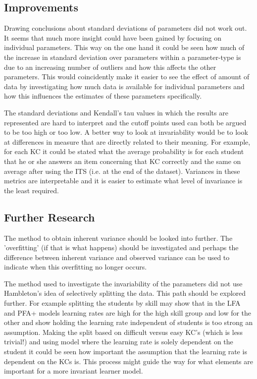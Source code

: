 \documentclass{scrartcl}
\begin{document}
\subsection{Improvements}
Drawing conclusions about standard deviations of parameters did not work out. It seems that much more insight could have been gained by focusing on individual parameters. This way on the one hand it could be seen how much of the increase in standard deviation over parameters within a parameter-type is due to an increasing number of outliers and how this affects the other parameters. This would coincidently make it easier to see the effect of amount of data by investigating how much data is available for individual parameters and how this influences the estimates of these parameters specifically.

The standard deviations and Kendall's tau values in which the results are represented are hard to interpret and the cutoff points used can both be argued to be too high or too low. A better way to look at invariability would be to look at differences in measure that are directly related to their meaning. For example, for each KC it could be stated what the average probability is for each student that he or she answers an item concerning that KC correctly and the same on average after using the ITS (i.e. at the end of the dataset). Variances in these metrics are interpretable and it is easier to estimate what level of invariance is the least required.

\subsection{Further Research}
The method to obtain inherent variance should be looked into further. The 'overfitting' (if that is what happens) should be investigated and perhaps the difference between inherent variance and observed variance can be used to indicate when this overfitting no longer occurs.

The method used to investigate the invariability of the parameters did not use Hambleton's idea of selectively splitting the data. This path should be explored further. For example splitting the students by skill may show that in the LFA and PFA+ models learning rates are high for the high skill group and low for the other and show holding the learning rate independent of students is too strong an assumption. Making the split based on difficult versus easy KC's (which is less trivial!) and using model where the learning rate is solely dependent on the student it could be seen how important the assumption that the learning rate is dependent on the KCs is. This process might guide the way for what elements are important for a more invariant learner model.
\end{document}
